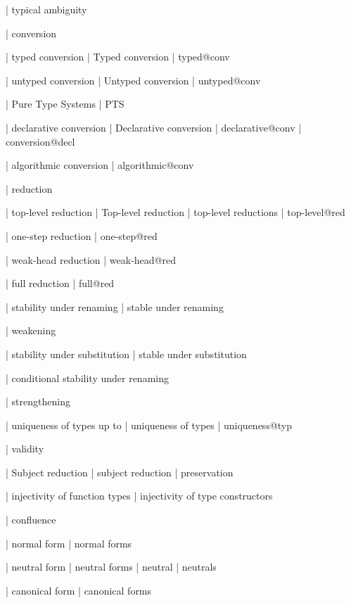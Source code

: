   | typical ambiguity


  | conversion

  | typed conversion
  | Typed conversion
  | typed@conv

  | untyped conversion
  | Untyped conversion
  | untyped@conv

  | Pure Type Systems
  | PTS

  | declarative conversion
  | Declarative conversion
  | declarative@conv
  | conversion@decl

  | algorithmic conversion
  | algorithmic@conv

  | reduction

  | top-level reduction
  | Top-level reduction
  | top-level reductions
  | top-level@red

  | one-step reduction
  | one-step@red

  | weak-head reduction
  | weak-head@red

  | full reduction
  | full@red

  | stability under renaming
  | stable under renaming

  | weakening

  | stability under substitution
  | stable under substitution

  | conditional stability under renaming

  | strengthening

  | uniqueness of types up to
  | uniqueness of types
  | uniqueness@typ

  | validity

  | Subject reduction
  | subject reduction
  | preservation

  | injectivity of function types
  | injectivity of type constructors

  | confluence

  | normal form
  | normal forms

  | neutral form
  | neutral forms
  | neutral
  | neutrals

  | canonical form
  | canonical forms

